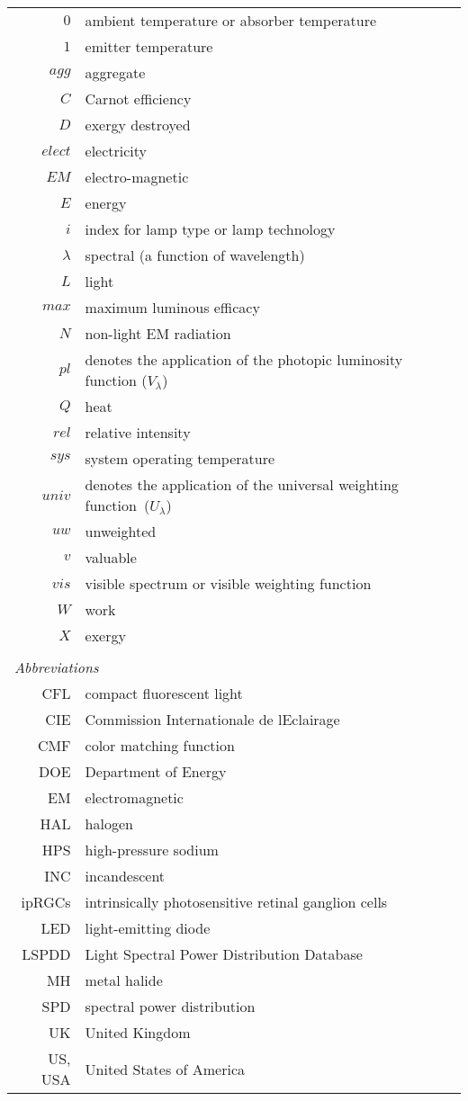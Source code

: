 \begin{center}
\begin{longtable}{r l}
  $0$ & ambient temperature or absorber temperature \\
  $1$ & emitter temperature \\
  $agg$ & aggregate \\
  $C$ & Carnot efficiency \\
  $D$ & exergy destroyed \\
  $elect$ & electricity \\
  $E\!M$ & electro-magnetic \\
  $E$ & energy \\
  $i$ & index for lamp type or lamp technology \\
  $\lambda$ & spectral (a function of wavelength) \\
  $L$ & light \\
  $max$ & maximum luminous efficacy \\
  $N$ & non-light EM radiation \\
  $pl$ & denotes the application of the photopic luminosity function ($V_{\lambda}$) \\
  $Q$ & heat \\
  $rel$ & relative intensity \\
  $sys$ & system operating temperature \\
  $univ$ & denotes the application of the universal weighting function~($U_\lambda$) \\
  $uw$ & unweighted \\
  $v$ & valuable \\
  $vis$ & visible spectrum or visible weighting function \\
  $W$ & work \\
  $X$ & exergy \\
%
\multicolumn{2}{l}{} \\ %
\multicolumn{2}{l}{\emph{Abbreviations}} \\ 
%
  CFL & compact fluorescent light \\
  CIE & Commission Internationale de l\textquotesingle{}Eclairage \\
  CMF & color matching function \\
  DOE & Department of Energy \\
  EM & electromagnetic \\
  HAL & halogen \\
  HPS & high-pressure sodium \\
  INC & incandescent \\
  ipRGCs & intrinsically photosensitive retinal ganglion cells \\
  LED & light-emitting diode \\
  LSPDD & Light Spectral Power Distribution Database \\
  MH & metal halide \\
  SPD & spectral power distribution \\
  UK & United Kingdom \\
  US, USA & United States of America \\
%
\end{longtable}
\end{center}


